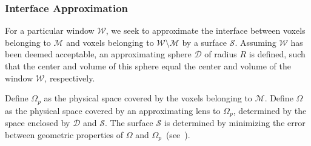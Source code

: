 \subsubsection{Interface Approximation}

For a particular window $\mathcal{W}$, we seek to approximate the interface between voxels belonging to $\mathcal{M}$ and voxels belonging to $\mathcal{W} \setminus \mathcal{M}$ by a surface $\mathcal{S}$. Assuming $\mathcal{W}$ has been deemed acceptable, an approximating sphere $\mathcal{D}$ of radius $R$ is defined, such that the center and volume of this sphere equal the center and volume of the window $\mathcal{W}$, respectively.

Define $\Omega_p$ as the physical space covered by the voxels belonging to $\mathcal{M}$. Define $\Omega$ as the physical space covered by an approximating lens to $\Omega_p$, determined by the space enclosed by $\mathcal{D}$ and $\mathcal{S}$. The surface $\mathcal{S}$ is determined by minimizing the error between geometric properties of $\Omega$ and $\Omega_p$~(see~).

